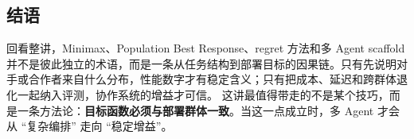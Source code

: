 \subsection{结语}
回看整讲，Minimax、Population Best Response、regret 方法和多 Agent scaffold 并不是彼此独立的术语，而是一条从任务结构到部署目标的因果链。只有先说明对手或合作者来自什么分布，性能数字才有稳定含义；只有把成本、延迟和跨群体退化一起纳入评测，协作系统的增益才可信。
这讲最值得带走的不是某个技巧，而是一条方法论：\textbf{目标函数必须与部署群体一致}。当这一点成立时，多 Agent 才会从 ``复杂编排'' 走向 ``稳定增益''。


